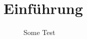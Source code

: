 \documentclass[../main.tex]{subfiles}
\begin{document}
\section{Einführung}
\begin{figure}[h]
    \centering

    \caption{Some Test}
    \label{meas_1_20}
\end{figure}
\end{document}
